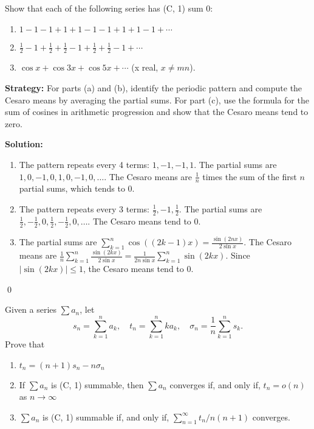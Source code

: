 \begin{problembox}
Show that each of the following series has (C, 1) sum 0:
\begin{enumerate}[label=\alph*)]
\item \(1 - 1 - 1 + 1 + 1 - 1 - 1 + 1 + 1 - 1 + \cdots\)
\item \(\frac{1}{2} - 1 + \frac{1}{2} + \frac{1}{2} - 1 + \frac{1}{2} + \frac{1}{2} - 1 + \cdots\)
\item \(\cos x + \cos 3x + \cos 5x + \cdots\) (x real, \(x \neq mn\)).
\end{enumerate}
\end{problembox}

\noindent\textbf{Strategy:} For parts (a) and (b), identify the periodic pattern and compute the Cesaro means by averaging the partial sums. For part (c), use the formula for the sum of cosines in arithmetic progression and show that the Cesaro means tend to zero.

\bigskip\noindent\textbf{Solution:}
\begin{enumerate}[label=(\alph*)]
\item The pattern repeats every 4 terms: \(1, -1, -1, 1\). The partial sums are \(1, 0, -1, 0, 1, 0, -1, 0, \ldots\). The Cesaro means are \(\frac{1}{n}\) times the sum of the first \(n\) partial sums, which tends to 0.

\item The pattern repeats every 3 terms: \(\frac{1}{2}, -1, \frac{1}{2}\). The partial sums are \(\frac{1}{2}, -\frac{1}{2}, 0, \frac{1}{2}, -\frac{1}{2}, 0, \ldots\). The Cesaro means tend to 0.

\item The partial sums are \(\sum_{k=1}^n \cos((2k-1)x) = \frac{\sin(2nx)}{2\sin x}\). The Cesaro means are \(\frac{1}{n} \sum_{k=1}^n \frac{\sin(2kx)}{2\sin x} = \frac{1}{2n\sin x} \sum_{k=1}^n \sin(2kx)\). Since \(|\sin(2kx)| \leq 1\), the Cesaro means tend to 0.
\end{enumerate}\qed



\begin{problembox}
Given a series \(\sum a_n\), let
\[s_n = \sum_{k=1}^{n} a_k, \quad t_n = \sum_{k=1}^{n} k a_k, \quad \sigma_n = \frac{1}{n} \sum_{k=1}^{n} s_k.\]
Prove that
\begin{enumerate}[label=\alph*)]
\item \(t_n = (n + 1)s_n - n\sigma_n\)
\item If \(\sum a_n\) is (C, 1) summable, then \(\sum a_n\) converges if, and only if, \(t_n = o(n)\) as \(n \to \infty\)
\item \(\sum a_n\) is (C, 1) summable if, and only if, \(\sum_{n=1}^{\infty} t_n / n(n + 1)\) converges.
\end{enumerate}
\end{problembox}

